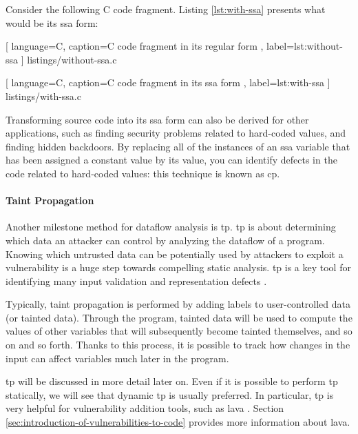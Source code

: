 Consider the following C code fragment. Listing \ref{lst:with-ssa} presents what would be its \gls{ssa} form:

\vspace{0.5cm}


    [
        language=C,
        caption=C code fragment in its regular form \cite{chess2007secure},
        label=lst:without-ssa
    ]
    {listings/without-ssa.c}

\vspace{0.5cm}


    [
        language=C,
        caption=C code fragment in its \gls{ssa} form \cite{chess2007secure},
        label=lst:with-ssa
    ]
    {listings/with-ssa.c}

Transforming source code into its \gls{ssa} form can also be derived for other applications, such as finding security problems related to hard-coded values, and finding hidden backdoors. By replacing all of the instances of an \gls{ssa} variable that has been assigned a constant value by its value, you can identify defects in the code related to hard-coded values: this technique is known as \gls{cp}.

\paragraph{Taint Propagation}

Another milestone method for dataflow analysis is \gls{tp}. \Gls{tp} is about determining which data an attacker can control by analyzing the dataflow of a program. Knowing which untrusted data can be potentially used by attackers to exploit a vulnerability is a huge step towards compelling static analysis. \Gls{tp} is a key tool for identifying many input validation and representation defects \cite{chess2007secure}.

Typically, taint propagation is performed by adding labels to user-controlled data (or tainted data). Through the program, tainted data will be used to compute the values of other variables that will subsequently become tainted themselves, and so on and so forth. Thanks to this process, it is possible to track how changes in the input can affect variables much later in the program.

\Gls{tp} will be discussed in more detail later on. Even if it is possible to perform \gls{tp} statically, we will see that dynamic \gls{tp} is usually preferred. In particular, \gls{tp} is very helpful for vulnerability addition tools, such as \acrshort{lava} \cite{dolan2016lava}. Section \ref{sec:introduction-of-vulnerabilities-to-code} provides more information about \gls{lava}.

